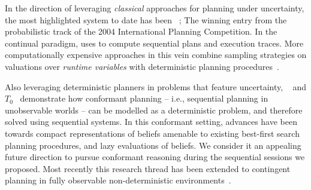 






In the direction of leveraging {\em classical} approaches for
planning under uncertainty, the most highlighted system to date has
been ~\cite{yoon:etal:2007}; The winning entry from
the probabilistic track of the 2004 International Planning
Competition.  In the continual paradigm, 
uses  to compute sequential plans and execution traces.
More computationally expensive approaches in this vein combine
sampling strategies on valuations over {\em runtime variables} with
deterministic planning procedures~\cite{yoon:etal:2008}. %

Also leveraging deterministic planners in problems that feature
uncertainty, ~\cite{hoffmann:brafman:2006} and
$T_0$~\cite{palacios:geffner:2009} demonstrate how conformant planning
-- i.e., sequential planning in unobservable worlds -- can be modelled
as a deterministic problem, and therefore solved using sequential
systems. In this conformant setting, advances have been towards
compact representations of beliefs amenable to existing best-first
search planning procedures, and lazy evaluations of beliefs. We
consider it an appealing future direction to pursue conformant
reasoning during the sequential sessions we proposed. Most recently
this research thread has been extended to contingent planning in fully
observable non-deterministic environments~\cite{albore:etal:2009}.
